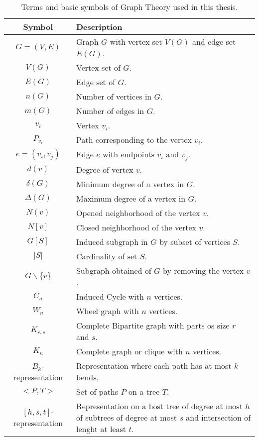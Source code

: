 \begin{table}[h]
\caption{Terms and basic symbols of Graph Theory used in this thesis.}
\label{tab:terminologyTable}
\begin{center}
\begin{tabular}{|c|p{10cm}|}
 \rowcolor{gray!50}
\hline 
Symbol & Description \\ 
\hline \hline  
$G=(V,E)$& Graph $G$ with vertex set $V(G)$ and edge set $E(G)$. \\
\hline 
$V(G)$ & Vertex set of $G$. \\
\hline 
$E(G)$ & Edge set of $G$.\\
\hline 
$n(G)$& Number of vertices in $G$. \\
\hline 
$m(G)$& Number of edges in $G$.\\
\hline 
$v_i$& Vertex $v_i$. \\
\hline 
$P_{v_i}$& Path corresponding to the vertex $v_i$. \\
\hline 
$e=(v_i,v_j)$& Edge $e$ with endpoints  $v_i$ and $v_j$. \\
\hline 
$d(v)$& Degree of vertex $v$. \\
\hline 
$\delta(G)$& Minimum degree of a vertex in $G$. \\
\hline 
$\Delta(G)$ & Maximum degree of a vertex in $G$.  \\
\hline 
$N(v)$ & Opened neighborhood of the vertex $v$. \\
\hline 
$N[v]$& Closed neighborhood of the vertex $v$. \\
\hline 
$G[S]$ & Induced subgraph in $G$ by subset of vertices $S$. \\
\hline 
$|S|$ & Cardinality of set $S$. \\
\hline 
$G\backslash \{v\}$ & Subgraph obtained of $G$ by removing the vertex $v$. \\
\hline 
$C_n$ & Induced Cycle with $n$ vertices. \\
\hline 
$W_n$ & Wheel graph with $n$ vertices. \\
\hline
$K_{r,s}$  &  Complete Bipartite graph with parts os size $r$ and $s$.   \\
\hline
  $K_n$ & Complete graph or clique with $n$ vertices.   \\
 \hline 
 $B_k$-representation & Representation where each path has at most $k$ bends.  \\
 \hline
  $<P,T>$ & Set of paths $P$ on a tree $T$.  \\
  $[h,s,t]$-representation & Representation on a host tree of degree at most $h$ of subtrees of degree at most $s$ and intersection of lenght at least $t$.  \\
\hline 
\end{tabular} 
\end{center}
\end{table}

